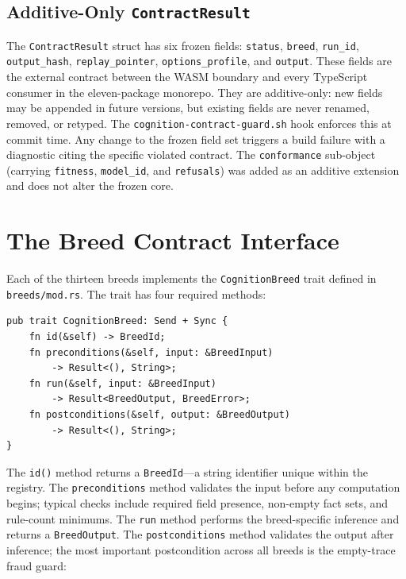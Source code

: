 \subsection{Additive-Only \texttt{ContractResult}}

The \texttt{ContractResult} struct has six frozen fields: \texttt{status}, \texttt{breed}, \texttt{run\_id}, \texttt{output\_hash}, \texttt{replay\_pointer}, \texttt{options\_profile}, and \texttt{output}. These fields are the external contract between the WASM boundary and every TypeScript consumer in the eleven-package monorepo. They are additive-only: new fields may be appended in future versions, but existing fields are never renamed, removed, or retyped. The \texttt{cognition-contract-guard.sh} hook enforces this at commit time. Any change to the frozen field set triggers a build failure with a diagnostic citing the specific violated contract. The \texttt{conformance} sub-object (carrying \texttt{fitness}, \texttt{model\_id}, and \texttt{refusals}) was added as an additive extension and does not alter the frozen core.

\section{The Breed Contract Interface}
\label{sec:breed-contract}

Each of the thirteen breeds implements the \texttt{CognitionBreed} trait defined in \texttt{breeds/mod.rs}. The trait has four required methods:

\begin{verbatim}
pub trait CognitionBreed: Send + Sync {
    fn id(&self) -> BreedId;
    fn preconditions(&self, input: &BreedInput)
        -> Result<(), String>;
    fn run(&self, input: &BreedInput)
        -> Result<BreedOutput, BreedError>;
    fn postconditions(&self, output: &BreedOutput)
        -> Result<(), String>;
}
\end{verbatim}

The \texttt{id()} method returns a \texttt{BreedId}---a string identifier unique within the registry. The \texttt{preconditions} method validates the input before any computation begins; typical checks include required field presence, non-empty fact sets, and rule-count minimums. The \texttt{run} method performs the breed-specific inference and returns a \texttt{BreedOutput}. The \texttt{postconditions} method validates the output after inference; the most important postcondition across all breeds is the empty-trace fraud guard:

